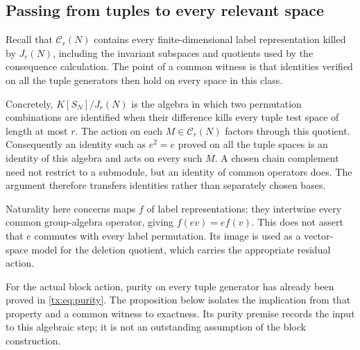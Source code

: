 \subsection{Passing from tuples to every relevant space}
Recall that $\mathcal C_r(N)$ contains every finite-dimensional
label representation killed by $J_r(N)$, including the invariant
subspaces and quotients used by the consequence calculation. The
point of a common witness is that identities verified on all the
tuple generators then hold on every space in this class.

Concretely, $K[S_N]/J_r(N)$ is the algebra in which two permutation
combinations are identified when their difference kills every tuple
test space of length at most $r$. The action on each $M\in\mathcal C_r(N)$ factors
through this quotient. Consequently an identity such as $e^2=e$
proved on all the tuple spaces is an identity of this algebra and
acts on every such $M$. A chosen chain complement need not restrict
to a submodule, but an identity of common operators does. The argument
therefore transfers identities rather than separately chosen bases.

Naturality here concerns maps $f$ of label representations: they
intertwine every common group-algebra operator, giving
$f(ev)=e f(v)$. This does not assert that $e$ commutes with every
label permutation. Its image is used as a vector-space model for
the deletion quotient, which carries the appropriate residual action.

For the actual block action, purity on every tuple generator has
already been proved in \eqref{tx:eq:purity}. The proposition below
isolates the implication from that property and a common witness to
exactness. Its purity premise records the input to this algebraic
step; it is not an outstanding assumption of the block construction.

